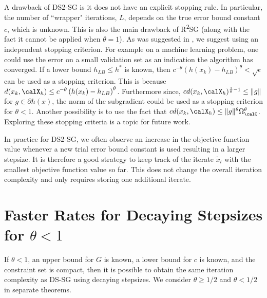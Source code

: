 \documentclass[smallextended]{svjour3}
\begin{document}
 A drawback of DS2-SG is it does not have an explicit stopping rule. In particular, the number of ``wrapper" iterations, $L$, depends on the true error bound constant $c$, which is unknown. This is also the main drawback of R\textsuperscript{2}SG \cite{yang2015rsg} (along with the fact it cannot be applied when $\theta=1$). As was suggested in \cite{yang2015rsg}, we suggest using an independent stopping criterion. For example on a machine learning problem, one could use the error on a  small validation set as an indication the algorithm has converged. If a lower bound $h_{LB}\leq h^*$ is known, then $c^{-\theta}\left(h(x_k)-h_{LB}\right)^\theta<\sqrt{\epsilon}$ can be used as a stopping criterion. This is because  $d(x_k,\calX_h)\leq c^{-\theta}\left(h(x_k)-h_{LB}\right)^\theta$.  Furthermore since, $c d(x_k,\calX_h)^{\frac{1}{\theta}-1}\leq\|g\|$ for $g\in\partial h(x)$, the norm of the subgradient could be used as a stopping criterion for $\theta<1$. Another possibility is to use the fact that $c d(x_k,\calX_h)\leq \|g\|^\theta \Omega_{\calC}^\theta$. Exploring these stopping criteria is a topic for future work. %
   
   In practice for DS2-SG, we often observe an increase in the objective function value whenever a new trial error bound constant is used resulting in a larger stepsize. It is therefore a good strategy to keep track of the iterate $\tilde{x}_l$ with the smallest objective function value so far. This does not change the overall iteration complexity and only requires storing one additional iterate.  
   

 
 
 
 
 
\section{Faster Rates for Decaying Stepsizes for $\theta<1$}\label{sec_sum}
If $\theta<1$, an upper bound for $G$ is known, a lower bound for $c$ is known, and the constraint set is compact, then it is possible to obtain the same iteration complexity as DS-SG using decaying stepsizes. We consider $\theta\geq 1/2$ and $\theta<1/2$ in separate theorems. 
\end{document}
